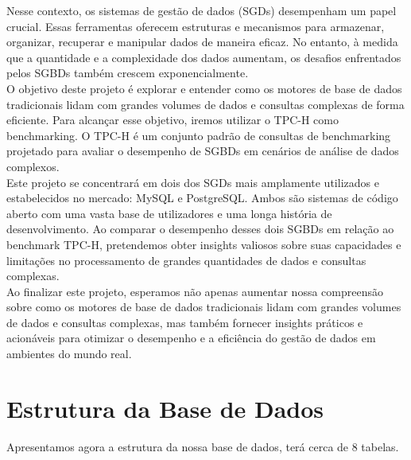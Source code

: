 \documentclass{article}
\begin{document}
\quad Nesse contexto, os sistemas de gestão de dados (SGDs) desempenham um papel crucial. Essas ferramentas oferecem estruturas e mecanismos para armazenar, organizar, recuperar e manipular dados de maneira eficaz. No entanto, à medida que a quantidade e a complexidade dos dados aumentam, os desafios enfrentados pelos SGBDs também crescem exponencialmente.\\

\quad O objetivo deste projeto é explorar e entender como os motores de base de dados tradicionais lidam com grandes volumes de dados e consultas complexas de forma eficiente. Para alcançar esse objetivo, iremos utilizar o TPC-H como benchmarking. O TPC-H é um conjunto padrão de consultas de benchmarking projetado para avaliar o desempenho de SGBDs em cenários de análise de dados complexos.\\

\quad Este projeto se concentrará em dois dos SGDs mais amplamente utilizados e estabelecidos no mercado: MySQL e PostgreSQL. Ambos são sistemas de código aberto com uma vasta base de utilizadores e uma longa história de desenvolvimento. Ao comparar o desempenho desses dois SGBDs em relação ao benchmark TPC-H, pretendemos obter insights valiosos sobre suas capacidades e limitações no processamento de grandes quantidades de dados e consultas complexas.\\

\quad Ao finalizar este projeto, esperamos não apenas aumentar nossa compreensão sobre como os motores de base de dados tradicionais lidam com grandes volumes de dados e consultas complexas, mas também fornecer insights práticos e acionáveis para otimizar o desempenho e a eficiência do gestão de dados em ambientes do mundo real.\\
\clearpage

\section{Estrutura da Base de Dados}
Apresentamos agora a estrutura da nossa base de dados, terá cerca de 8 tabelas.\\
\end{document}
